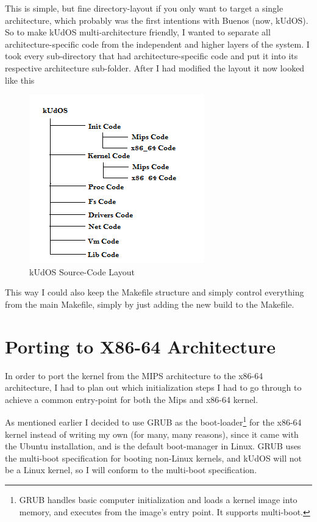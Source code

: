This is simple, but fine directory-layout if you only want to target a single architecture, which probably was the first intentions with Buenos (now, kUdOS). So to make kUdOS multi-architecture friendly, I wanted to separate all architecture-specific code from the independent and higher layers of the system. I took every sub-directory that had architecture-specific code and put it into its respective architecture sub-folder. After I had modified the layout it now looked like this

\begin{figure}[h]
    \centering
    \includegraphics{DirectoryLayoutEnd.png}
    \caption{kUdOS Source-Code Layout}
    \label{fig:code_layout_end}
\end{figure}

This way I could also keep the Makefile structure and simply control everything from the main Makefile, simply by just adding the new build to the Makefile.

\section{Porting to X86-64 Architecture}

In order to port the kernel from the MIPS architecture to the x86-64 architecture, I had to plan out which initialization steps I had to go through to achieve a common entry-point for both the Mips and x86-64 kernel.

As mentioned earlier I decided to use GRUB as the boot-loader\footnote{GRUB handles basic computer initialization and loads a kernel image into memory, and executes from the image's entry point. It supports multi-boot.} for the x86-64 kernel instead of writing my own (for many, many reasons), since it came with the Ubuntu installation, and is the default boot-manager in Linux. GRUB uses the multi-boot specification for booting non-Linux kernels, and kUdOS will not be a Linux kernel, so I will conform to the multi-boot specification.

